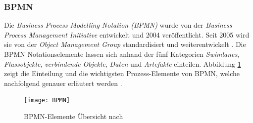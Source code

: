 \subsubsection {BPMN}

Die \textit{Business Process Modelling Notation (BPMN)} wurde von der \textit{Business Process Management Initiative} entwickelt und 2004 veröffentlicht. Seit 2005 wird sie von der \textit{Object Management Group} standardisiert und weiterentwickelt \cite{krallmann2013}.
Die BPMN Notationselemente lassen sich anhand der fünf Kategorien \textit{Swimlanes}, \textit{Flussobjekte}, \textit{verbindende Objekte}, \textit{Daten} und \textit{Artefakte} einteilen. Abbildung \ref{fig:BPMN} zeigt die Einteilung und die wichtigsten Prozess-Elemente von BPMN, welche nachfolgend genauer erläutert werden \cite{gpfert2012}. \newline

\begin{figure}[htp]
\begin{center}
  \texttt{[image: BPMN]} %
  \caption{BPMN-Elemente Übersicht nach \cite{gpfert2012}}
  \label{fig:BPMN}
\end{center}
\end{figure}

